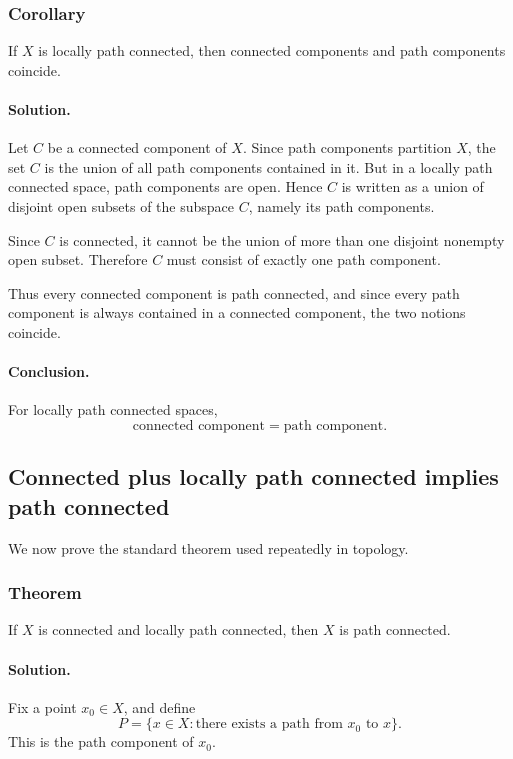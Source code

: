 \documentclass[12pt,a4paper]{article}
\theoremstyle{notespace}
\begin{document}
\subsubsection{Corollary}

If \(X\) is locally path connected, then connected components and path components coincide.

\paragraph{\textbf{Solution.}}
Let \(C\) be a connected component of \(X\). Since path components partition \(X\), the set \(C\) is the union of all path components contained in it. But in a locally path connected space, path components are open. Hence \(C\) is written as a union of disjoint open subsets of the subspace \(C\), namely its path components.

Since \(C\) is connected, it cannot be the union of more than one disjoint nonempty open subset. Therefore \(C\) must consist of exactly one path component.

Thus every connected component is path connected, and since every path component is always contained in a connected component, the two notions coincide.

\paragraph{Conclusion.}
For locally path connected spaces,
\[
\text{connected component}=\text{path component}.
\]

\subsection{Connected plus locally path connected implies path connected}

We now prove the standard theorem used repeatedly in topology.

\subsubsection{Theorem}

If \(X\) is connected and locally path connected, then \(X\) is path connected.

\paragraph{\textbf{Solution.}}
Fix a point \(x_0\in X\), and define
\[
P
=
\{x\in X : \text{there exists a path from }x_0\text{ to }x\}.
\]
This is the path component of \(x_0\).
\end{document}
